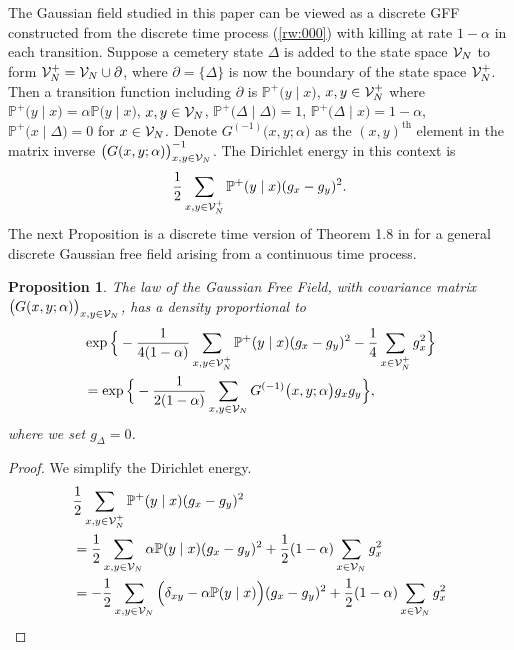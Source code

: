 \documentclass[preprint,11pt]{elsarticle}
\newtheorem{Proposition}{Proposition}
\theoremstyle{remark}
\begin{document}
{The Gaussian field studied in this paper can be viewed as a discrete GFF constructed from the discrete time process (\ref{rw:000}) with killing at rate $1-\alpha$ in each transition. Suppose a cemetery state $\Delta$ is added to the state space
${\cal V}_N$ to form ${\cal V}_N^+ = {\cal V}_N\cup \partial$, where $\partial = \{\Delta\}$ is now the boundary of the state space ${\cal V}_N^+$. 
Then a transition function including $\partial$ is 
$\mathbb{P}^+\big (y\mid x\big )$, $x,y\in {\cal V}_N^+$ where
$\mathbb{P}^+\big (y\mid x\big )=\alpha\mathbb{P}\big (y\mid x\big )$, $x,y \in {\cal V}_N$,
$\mathbb{P}^+\big (\Delta\mid\Delta\big ) = 1$,  $\mathbb{P}^+\big (\Delta \mid x\big ) = 1-\alpha$, $\mathbb{P}^+\big (x\mid \Delta\big )=0$
 for $x\in {\cal V}_N$. Denote $G^{(-1)}\big (x,y;\alpha\big )$ as the
 $(x,y)^{\text{th}}$ element in the matrix inverse
$ \big (G(x,y;\alpha)\big )^{-1}_{ x,y\in {\cal V}_N  }$.
The Dirichlet energy in this context is
\[
 \frac{1}{2}
 \sum_{x,y \in {\cal V}_N^+}\mathbb{P}^+(y\mid x)(g_x-g_y)^2.
 \]
 The next Proposition is a discrete time version of Theorem 1.8 in \cite{B2016} for a general discrete Gaussian free field arising from a continuous time process.
 \begin{Proposition}\label{GFFEnergy}
 The law of the Gaussian Free Field, with covariance matrix 
 $ \big (G(x,y;\alpha)\big )_{ x,y\in {\cal V}_N  }$,
 has a density proportional to
 \begin{align}
 &\exp \Big \{-\frac{1}{4(1-\alpha)}
 \sum_{x,y \in {\cal V}_N^+}\mathbb{P}^+(y\mid x)(g_x-g_y)^2 
 - \frac{1}{4}\sum_{x\in {\cal V}^+_N}g_x^2
 \Big \}\nonumber\\
 &=  \exp \Big \{ -\frac{1}{2(1-\alpha)}\sum_{x,y\in {\cal V}_N}
 G^{(-1)}\big (x,y;\alpha\big )
 g_xg_y\Big\},
 \label{GFF:00}
 \end{align}
 where we set $g_\Delta=0$.
 \end{Proposition}
 \begin{proof}
 We simplify the Dirichlet energy.
  \begin{align}
 &\frac{1}{2}
 \sum_{x,y \in {\cal V}_N^+}\mathbb{P}^+(y\mid x)(g_x-g_y)^2\nonumber\\
 &=\frac{1}{2}
\sum_{x,y \in {\cal V}_N}\alpha\mathbb{P}(y\mid x)(g_x-g_y)^2+\frac{1}{2}(1-\alpha)\sum_{x\in {\cal V}_N}g_x^2\nonumber\\
 &= -\frac{1}{2}\sum_{x, y \in {\cal V}_N}
 \Big (\delta_{xy} - \alpha\mathbb{P}(y\mid x)\Big )(g_x-g_y)^2+\frac{1}{2}(1-\alpha)\sum_{x\in {\cal V}_N}g_x^2\nonumber\\

\end{align}
\end{proof}}
\end{document}
